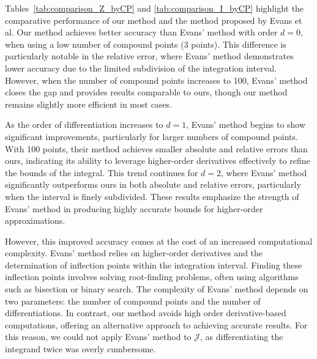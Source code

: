 \documentclass[review]{elsarticle}
\begin{document}
Tables~\ref{tab:comparison_Z_byCP} and \ref{tab:comparison_I_byCP} highlight the comparative performance of our method and the method proposed by Evans et al. Our method achieves better accuracy than Evans' method with order $d=0$, when using a low number of compound points (3 points). This difference is particularly notable in the relative error, where Evans' method demonstrates lower accuracy due to the limited subdivision of the integration interval. However, when the number of compound points increases to 100, Evans' method closes the gap and provides results comparable to ours, though our method remains slightly more efficient in most cases.

As the order of differentiation increases to $d = 1$, Evans' method begins to show significant improvements, particularly for larger numbers of compound points. With 100 points, their method achieves smaller absolute and relative errors than ours, indicating its ability to leverage higher-order derivatives effectively to refine the bounds of the integral. This trend continues for $d = 2$, where Evans' method significantly outperforms ours in both absolute and relative errors, particularly when the interval is finely subdivided. These results emphasize the strength of Evans' method in producing highly accurate bounds for higher-order approximations.

However, this improved accuracy comes at the cost of an increased computational complexity. Evans’ method relies on higher-order derivatives and the determination of inflection points within the integration interval. Finding these inflection points involves solving root-finding problems, often using algorithms such as bisection or binary search. The complexity of Evans’ method depends on two parameters: the number of compound points and the number of differentiations. In contrast, our method avoids high order derivative-based computations, offering an alternative approach to achieving accurate results. For this reason, we could not apply Evans’ method to $\mathcal{J}$, as differentiating the integrand twice was overly cumbersome.
\end{document}

